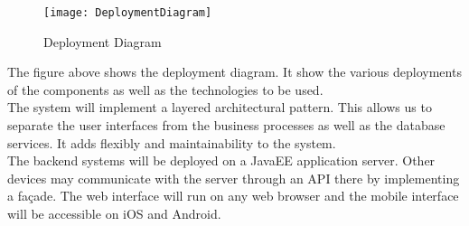 \begin{figure}[H]
  	\caption{Deployment Diagram}
  	\centering
    	\texttt{[image: DeploymentDiagram]}
\end{figure}

The figure above shows the deployment diagram. It show the various deployments of the components as well as the technologies to be used.\\[0.2cm]
The system will implement a layered architectural pattern. This allows us to separate the user interfaces from the business processes as well as the database services. It adds flexibly and maintainability to the system.\\[0.2cm]
The backend systems will be deployed on a JavaEE application server. Other devices may communicate with the server through an API there by implementing a façade. The web interface will run on any web browser and the mobile interface will be accessible on iOS and Android.